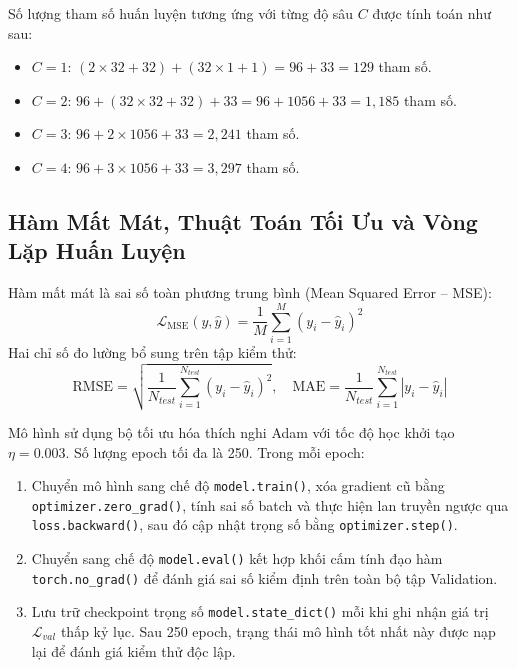 \documentclass[a4paper,13pt]{extarticle}
\begin{document}
Số lượng tham số huấn luyện tương ứng với từng độ sâu $C$ được tính toán như sau:
\begin{itemize}
    \item[-] $C = 1$: $(2 \times 32 + 32) + (32 \times 1 + 1) = 96 + 33 = 129$ tham số.
    \item[-] $C = 2$: $96 + (32 \times 32 + 32) + 33 = 96 + 1056 + 33 = 1,185$ tham số.
    \item[-] $C = 3$: $96 + 2 \times 1056 + 33 = 2,241$ tham số.
    \item[-] $C = 4$: $96 + 3 \times 1056 + 33 = 3,297$ tham số.
\end{itemize}

\subsection{Hàm Mất Mát, Thuật Toán Tối Ưu và Vòng Lặp Huấn Luyện}
Hàm mất mát là sai số toàn phương trung bình (Mean Squared Error -- MSE):
\begin{equation}
    \mathcal{L}_{\text{MSE}}(y, \hat{y}) = \frac{1}{M} \sum_{i=1}^M \left(y_i - \hat{y}_i\right)^2
\end{equation}
Hai chỉ số đo lường bổ sung trên tập kiểm thử:
\begin{equation}
    \text{RMSE} = \sqrt{\frac{1}{N_{test}}\sum_{i=1}^{N_{test}} (y_i - \hat{y}_i)^2}, \quad
    \text{MAE} = \frac{1}{N_{test}}\sum_{i=1}^{N_{test}} |y_i - \hat{y}_i|
\end{equation}

Mô hình sử dụng bộ tối ưu hóa thích nghi Adam với tốc độ học khởi tạo $\eta = 0.003$. Số lượng epoch tối đa là 250. Trong mỗi epoch:
\begin{enumerate}
    \item Chuyển mô hình sang chế độ \texttt{model.train()}, xóa gradient cũ bằng \texttt{optimizer.zero\_grad()}, tính sai số batch và thực hiện lan truyền ngược qua \texttt{loss.backward()}, sau đó cập nhật trọng số bằng \texttt{optimizer.step()}.
    \item Chuyển sang chế độ \texttt{model.eval()} kết hợp khối cấm tính đạo hàm \texttt{torch.no\_grad()} để đánh giá sai số kiểm định trên toàn bộ tập Validation.
    \item Lưu trữ checkpoint trọng số \texttt{model.state\_dict()} mỗi khi ghi nhận giá trị $\mathcal{L}_{val}$ thấp kỷ lục. Sau 250 epoch, trạng thái mô hình tốt nhất này được nạp lại để đánh giá kiểm thử độc lập.
\end{enumerate}
\end{document}
